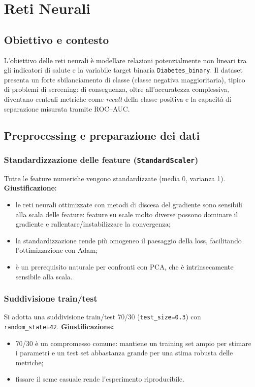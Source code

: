 
\chapter{Reti Neurali}
\label{chap:neural-networks}

\section{Obiettivo e contesto}
L'obiettivo delle reti neurali è modellare relazioni potenzialmente non lineari tra gli indicatori di salute e la variabile target binaria \texttt{Diabetes\_binary}.
Il dataset presenta un forte sbilanciamento di classe (classe negativa maggioritaria), tipico di problemi di screening: di conseguenza, oltre all'accuratezza complessiva, diventano centrali metriche come \emph{recall} della classe positiva e la capacità di separazione misurata tramite ROC--AUC.

\section{Preprocessing e preparazione dei dati}
\subsection{Standardizzazione delle feature (\texttt{StandardScaler})}
Tutte le feature numeriche vengono standardizzate (media 0, varianza 1).
\textbf{Giustificazione:}
\begin{itemize}
  \item le reti neurali ottimizzate con metodi di discesa del gradiente sono sensibili alla scala delle feature: feature su scale molto diverse possono dominare il gradiente e rallentare/instabilizzare la convergenza;
  \item la standardizzazione rende più omogeneo il paesaggio della loss, facilitando l'ottimizzazione con Adam;
  \item è un prerequisito naturale per confronti con PCA, che è intrinsecamente sensibile alla scala.
\end{itemize}

\subsection{Suddivisione train/test}
Si adotta una suddivisione train/test 70/30 (\texttt{test\_size=0.3}) con \texttt{random\_state=42}.
\textbf{Giustificazione:}
\begin{itemize}
  \item 70/30 è un compromesso comune: mantiene un training set ampio per stimare i parametri e un test set abbastanza grande per una stima robusta delle metriche;
  \item fissare il seme casuale rende l'esperimento riproducibile.
\end{itemize}

